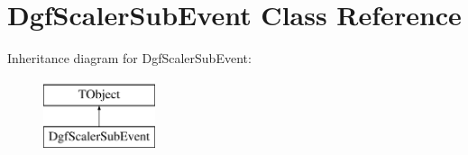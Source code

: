 \hypertarget{class_dgf_scaler_sub_event}{\section{Dgf\-Scaler\-Sub\-Event Class Reference}
\label{class_dgf_scaler_sub_event}
}
Inheritance diagram for Dgf\-Scaler\-Sub\-Event\-:\begin{figure}[H]
\begin{center}
\leavevmode
\includegraphics[height=2.000000cm]{class_dgf_scaler_sub_event}
\end{center}
\end{figure}
